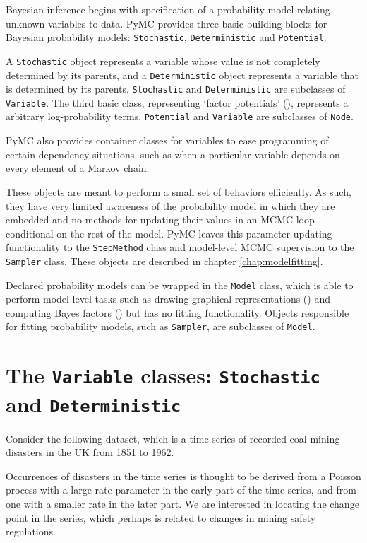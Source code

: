 
Bayesian inference begins with specification of a probability model relating unknown variables to data. PyMC provides three basic building blocks for Bayesian probability models: \texttt{Stochastic}, \texttt{Deterministic} and \texttt{Potential}. 

A \texttt{Stochastic} object represents a variable whose value is not completely determined by its parents, and a \texttt{Deterministic} object represents a variable that is determined by its parents. \texttt{Stochastic} and \texttt{Deterministic} are subclasses of \texttt{Variable}. The third basic class, representing `factor potentials' (\cite{dawidmarkov,jordangraphical}), represents a arbitrary log-probability terms. \texttt{Potential} and \texttt{Variable} are subclasses of \texttt{Node}.

PyMC also provides container classes for variables to ease programming of certain dependency situations, such as when a particular variable depends on every element of a Markov chain.

These objects are meant to perform a small set of behaviors efficiently. As such, they have very limited awareness of the probability model in which they are embedded and no methods for updating their values in an MCMC loop conditional on the rest of the model. PyMC leaves this parameter updating functionality to the \texttt{StepMethod} class and model-level MCMC supervision to the \texttt{Sampler} class. These objects are described in chapter \ref{chap:modelfitting}. 

Declared probability models can be wrapped in the \texttt{Model} class, which is able to perform model-level tasks such as drawing graphical representations (\cite{dawidmarkov,jordangraphical}) and computing Bayes factors (\cite{gelman}) but has no fitting functionality. Objects responsible for fitting probability models, such as \texttt{Sampler}, are subclasses of \texttt{Model}.

\section{The \texttt{Variable} classes: \texttt{Stochastic} and \texttt{Deterministic}}
Consider the following dataset, which is a time series of recorded coal mining disasters in the UK from 1851 to 1962.
\begin{center}
\end{center}
Occurrences of disasters in the time series is thought to be derived from a Poisson process with a large rate parameter in the early part of the time series, and from one with a smaller rate in the later part. We are interested in locating the change point in the series, which perhaps is related to changes in mining safety regulations.

